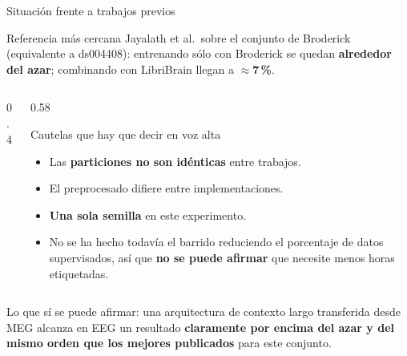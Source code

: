 \documentclass[aspectratio=169,10pt]{beamer}
\newcommand{\bigmetric}[2]{{\huge\bfseries\color{deepgreen}{#1}\par}\vspace{0.8mm}{\scriptsize #2\par}\vspace{3mm}}
\newcommand{\term}[1]{\textbf{\color{deepgreen}#1}}
\begin{document}
\begin{frame}[c]{Situación frente a trabajos previos}
  \small
  \begin{block}{Referencia más cercana}
    Jayalath et al.\ sobre el conjunto de Broderick (equivalente a ds004408): entrenando sólo con Broderick se quedan \term{alrededor del azar}; combinando con LibriBrain llegan a $\approx$\term{7\,\%}.
  \end{block}
  \vspace{2mm}
  \begin{columns}[c,totalwidth=\linewidth]
    \begin{column}{0.4\linewidth}
      \centering
      \bigmetric{22,32\,\%}{Top-10 balanceada, 250 palabras\\(azar: 4\,\%)}
    \end{column}
    \begin{column}{0.58\linewidth}
      \begin{alertblock}{Cautelas que hay que decir en voz alta}
        \begin{itemize}\footnotesize
          \item Las \term{particiones no son idénticas} entre trabajos.
          \item El preprocesado difiere entre implementaciones.
          \item \term{Una sola semilla} en este experimento.
          \item No se ha hecho todavía el barrido reduciendo el porcentaje de datos supervisados, así que \term{no se puede afirmar} que necesite menos horas etiquetadas.
        \end{itemize}
      \end{alertblock}
    \end{column}
  \end{columns}
  \vspace{2mm}
  \centering\small
  Lo que sí se puede afirmar: una arquitectura de contexto largo transferida desde MEG alcanza en EEG un resultado \term{claramente por encima del azar y del mismo orden que los mejores publicados} para este conjunto.
\end{frame}
\end{document}
